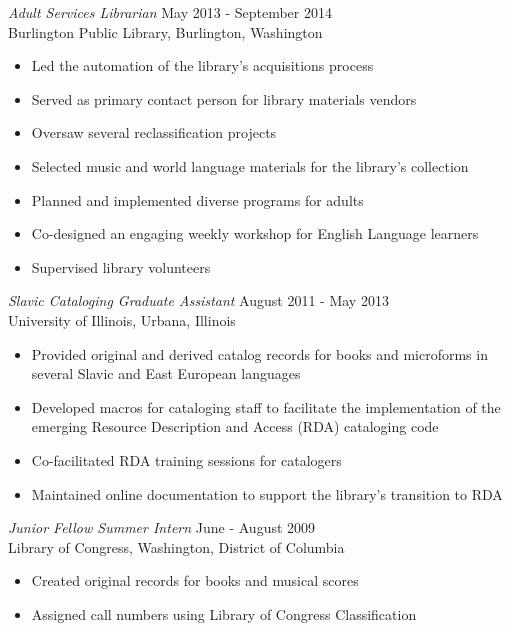 \documentclass[line,margin]{res}
\begin{document}
\begin{resume}
{\sl Adult Services Librarian} \hfill May 2013 - September 2014 \\
  Burlington Public Library, Burlington, Washington
    \begin{itemize}  \itemsep -1pt %
      \item Led the automation of the library's acquisitions process
      \item Served as primary contact person for library materials vendors
      \item Oversaw several reclassification projects
      \item Selected music and world language materials for the library's collection
      \item Planned and implemented diverse programs for adults
      \item Co-designed an engaging weekly workshop for English Language learners
      \item Supervised library volunteers
    \end{itemize}
\vspace{8pt}
    {\sl Slavic Cataloging Graduate Assistant} \hfill August 2011 - May 2013 \\
  University of Illinois, Urbana, Illinois
    \begin{itemize}  \itemsep -1pt %
      \item Provided original and derived catalog records for books and microforms in several Slavic and East European languages
      \item Developed macros for cataloging staff to facilitate the implementation of the emerging Resource Description and Access (RDA) cataloging code
      \item Co-facilitated RDA training sessions for catalogers
      \item Maintained online documentation to support the library's transition to RDA
    \end{itemize}

\vspace{8pt}
 
  {\sl Junior Fellow Summer Intern} \hfill June - August 2009 \\
  Library of Congress, Washington, District of Columbia
    \begin{itemize}  \itemsep -1pt
      \item Created original records for books and musical scores
      \item Assigned call numbers using Library of Congress Classification
    \end{itemize}
\vspace{8pt}


\end{resume}
\end{document}

